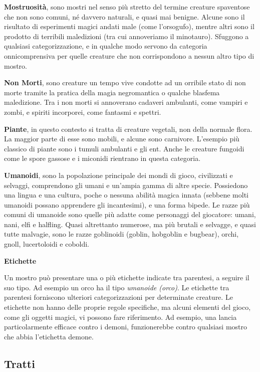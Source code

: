 \medskip\textbf{Mostruosità}, sono mostri nel senso più stretto del termine creature spaventose che non sono comuni, né davvero naturali, e quasi mai benigne. Alcune sono il risultato di esperimenti magici andati male (come l'orsogufo), mentre altri sono il prodotto di terribili maledizioni (tra cui annoveriamo il minotauro). Sfuggono a qualsiasi categorizzazione, e in qualche modo servono da categoria onnicomprensiva per quelle creature che non corrispondono a nessun altro tipo di mostro. 

\medskip\textbf{Non Morti}, sono creature un tempo vive condotte ad un orribile stato di non morte tramite la pratica della magia negromantica o qualche blasfema maledizione. Tra i non morti si annoverano cadaveri ambulanti, come vampiri e zombi, e spiriti incorporei, come fantasmi e spettri.

\medskip\textbf{Piante}, in questo contesto si tratta di creature vegetali, non della normale flora. La maggior parte di esse sono mobili, e alcune sono carnivore. L'esempio più classico di piante sono i tumuli ambulanti e gli ent. Anche le creature fungoidi come le spore gassose e i miconidi rientrano in questa categoria.

\medskip\textbf{Umanoidi}, sono la popolazione principale dei mondi di gioco, civilizzati e selvaggi, comprendono gli umani e un'ampia gamma di altre specie. Possiedono una lingua e una cultura, poche o nessuna abilità magica innata (sebbene molti umanoidi possano apprendere gli incantesimi), e una forma bipede. Le razze più comuni di umanoide sono quelle più adatte come personaggi del giocatore: umani, nani, elfi e halfling. Quasi altrettanto numerose, ma più brutali e selvagge, e quasi tutte malvagie, sono le razze goblinoidi (goblin, hobgoblin e bugbear), orchi, gnoll, lucertoloidi e coboldi.

\medskip\textbf{Etichette}

Un mostro può presentare una o più etichette indicate tra parentesi, a seguire il suo tipo. Ad esempio un orco ha il tipo \emph{umanoide (orco)}. Le etichette tra parentesi forniscono ulteriori categorizzazioni per determinate creature. Le etichette non hanno delle proprie regole specifiche, ma alcuni elementi del gioco, come gli oggetti magici, vi possono fare riferimento. Ad esempio, una lancia particolarmente efficace contro i demoni, funzionerebbe contro qualsiasi mostro che abbia l'etichetta demone.

\subsection{Tratti}

